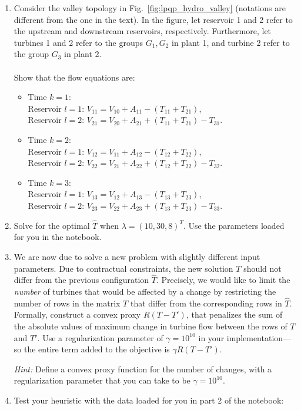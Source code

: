 \documentclass[11pt]{article}
\begin{document}
\begin{enumerate}
    \item Consider the valley topology in Fig.~\ref{fig:lpqp_hydro_valley} (notations are different from the one in the text). In the figure, let reservoir 1 and 2 refer to the upstream and downstream reservoirs, respectively. Furthermore, let turbines 1 and 2 refer to the groups $G_1, G_2$ in plant 1, and turbine 2 refer to the group $G_3$ in plant 2.  \\ \\
    Show that the flow equations are:
\begin{itemize}
\item Time $k = 1$: \\
Reservoir $l = 1$: $V_{11} = V_{10} + A_{11} - (T_{11} + T_{21})$,\\
Reservoir $l = 2$: $V_{21} = V_{20} + A_{21} + (T_{11} + T_{21}) - T_{31}$.
\item Time $k = 2$:\\
Reservoir $l = 1$: $V_{12} = V_{11} + A_{12} - (T_{12} + T_{22})$,\\
Reservoir $l = 2$: $V_{22} = V_{21} + A_{22} + (T_{12} + T_{22}) - T_{32}$.
\item Time $k = 3$:\\
Reservoir $l = 1$: $V_{13} = V_{12} + A_{13} - (T_{13} + T_{23})$,\\
Reservoir $l = 2$: $V_{23} = V_{22} + A_{23} + (T_{13} + T_{23}) - T_{33}$.
\end{itemize}

\item Solve for the optimal $\hat{T}$ when $\lambda = (10,30,8)^T$. Use the parameters loaded for you in the notebook.

\item We are now due to solve a new problem with slightly different input parameters.  Due to contractual constraints, the new solution $T$ should not differ from the previous configuration $\hat{T}$. Precisely, we would like to limit the \emph{number} of turbines that would be affected by a change by restricting the number of rows in the matrix $T$ that differ from the corresponding rows in $\hat{T}$. Formally, construct a convex proxy $R(T-T')$, that penalizes the sum of the absolute values of maximum change in turbine flow between the rows of $T$ and $T'$. Use a regularization parameter of $\gamma=10^{10}$ in your implementation---so the entire term added to the objective is $\gamma R(T-T')$.

\textit{Hint:} Define a convex proxy function for the number of changes, with a regularization parameter that you can take to be $\gamma = 10 ^{10}$.

\item Test your heuristic with the data loaded for you in part 2 of the notebook:

\end{enumerate}
\end{document}
